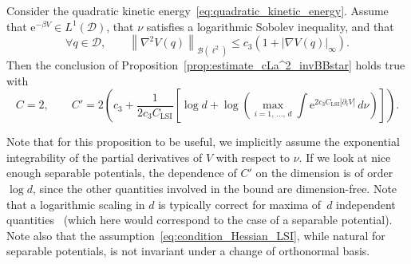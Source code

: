 \documentclass[10pt]{amsart}
\theoremstyle{definition}\newtheorem{defi}[theo]{Definition}\newtheorem{rema}[theo]{Remark}\newtheorem{exam}[theo]{Example}\newtheorem{exem}[theo]{Example}\newtheorem{nota}[theo]{Notation}
\newcommand{\rme}{\mathrm{e}}
\newcommand{\LSI}{\mathrm{LSI}}
\newcommand{\cB}{\mathcal{B}}
\newcommand{\cD}{\mathcal{D}}
\renewcommand{\leq}{\leqslant}
\let\oldforall\forall
\renewcommand*{\forall}{\mathrel{\oldforall}}
\begin{document}
\begin{prop}\label{prop:scaling_dimension_Langevin_improved}
Consider the quadratic kinetic energy~\eqref{eq:quadratic_kinetic_energy}. Assume that $\rme^{-\beta V} \in L^1(\cD)$, that $\nu$ satisfies a logarithmic Sobolev inequality, and that
\begin{equation}\label{eq:condition_Hessian_LSI}
\forall q \in \cD, \qquad \left\|\nabla^2V(q)\right\|_{\cB\left(\ell^2\right)} \leq c_3\left(1 +\left|\nabla V(q)\right|_{\infty}\right).
\end{equation}
Then the conclusion of Proposition~\ref{prop:estimate_cLa^2_invBBstar} holds true with
\[
C = 2, \qquad C' = 2\left(c_3 + \frac{1}{2c_3 C_{\LSI}}\left[\log d + \log\left(\max_{i=1,\,\dots,\,d} \int{\rme^{2c_3 C_{\LSI}\left|\partial_i V\right|} \, d\nu}\right)\right]\right).
\]
\end{prop}

Note that for this proposition to be useful, we implicitly assume the exponential integrability of the partial derivatives of $V$ with respect to $\nu$. If we look at nice enough separable potentials, the dependence of $C'$ on the dimension is of order $\log d$, since the other quantities involved in the bound are dimension-free. Note that a logarithmic scaling in $d$ is typically correct for maxima of~$d$ independent quantities~\cite[Lemma~2.2]{dev2001} (which here would correspond to the case of a separable potential). Note also that the assumption~\eqref{eq:condition_Hessian_LSI}, while natural for separable potentials, is not invariant under a change of orthonormal basis.
\end{document}
